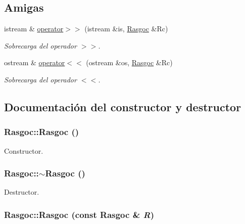 \subsection*{Amigas}
\begin{CompactItemize}
\item 
istream \& \hyperlink{class_rasgoc_ac54876205c0d8a293f2d37f28e2aefc}{operator$>$$>$} (istream \&is, \hyperlink{class_rasgoc}{Rasgoc} \&Rc)
\begin{CompactList}\small\item\em Sobrecarga del operador $>$$>$. \item\end{CompactList}\item 
ostream \& \hyperlink{class_rasgoc_c11a8a89e2f85849b22b3ee42aa58a02}{operator$<$$<$} (ostream \&os, \hyperlink{class_rasgoc}{Rasgoc} \&Rc)
\begin{CompactList}\small\item\em Sobrecarga del operador $<$$<$. \item\end{CompactList}\end{CompactItemize}


\subsection{Documentación del constructor y destructor}
\hypertarget{class_rasgoc_a1c1f3b173d54f802c40363f717dcffc}{
\subsubsection[{Rasgoc}]{\setlength{\rightskip}{0pt plus 5cm}Rasgoc::Rasgoc ()}}
\label{class_rasgoc_a1c1f3b173d54f802c40363f717dcffc}


Constructor. 

\hypertarget{class_rasgoc_efb7fb7a05cd333a18c0b60e5efd9d99}{
\subsubsection[{$\sim$Rasgoc}]{\setlength{\rightskip}{0pt plus 5cm}Rasgoc::$\sim$Rasgoc ()}}
\label{class_rasgoc_efb7fb7a05cd333a18c0b60e5efd9d99}


Destructor. 

\hypertarget{class_rasgoc_40f4540ed941f1b71372b26d53d5d645}{
\subsubsection[{Rasgoc}]{\setlength{\rightskip}{0pt plus 5cm}Rasgoc::Rasgoc (const {\bf Rasgoc} \& {\em R})}}
\label{class_rasgoc_40f4540ed941f1b71372b26d53d5d645}


